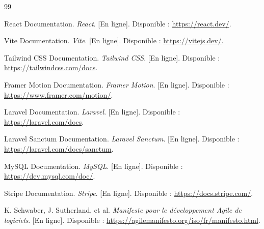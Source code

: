 \begin{thebibliography}{99}

React Documentation. 
\emph{React}. [En ligne]. Disponible : \url{https://react.dev/}.

Vite Documentation. 
\emph{Vite}. [En ligne]. Disponible : \url{https://vitejs.dev/}.

Tailwind CSS Documentation. 
\emph{Tailwind CSS}. [En ligne]. Disponible : \url{https://tailwindcss.com/docs}.

Framer Motion Documentation. 
\emph{Framer Motion}. [En ligne]. Disponible : \url{https://www.framer.com/motion/}.

Laravel Documentation. 
\emph{Laravel}. [En ligne]. Disponible : \url{https://laravel.com/docs}.

Laravel Sanctum Documentation. 
\emph{Laravel Sanctum}. [En ligne]. Disponible : \url{https://laravel.com/docs/sanctum}.

MySQL Documentation. 
\emph{MySQL}. [En ligne]. Disponible : \url{https://dev.mysql.com/doc/}.

Stripe Documentation. 
\emph{Stripe}. [En ligne]. Disponible : \url{https://docs.stripe.com/}.

K. Schwaber, J. Sutherland, et al. 
\emph{Manifeste pour le développement Agile de logiciels}. [En ligne]. Disponible : \url{https://agilemanifesto.org/iso/fr/manifesto.html}.

\end{thebibliography}
